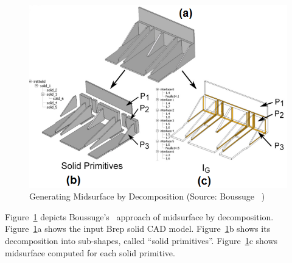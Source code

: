 
	\begin{figure} [!h]
		\centering
		\includegraphics[width=0.75\linewidth]{images/boussugedecomp}
		\caption{Generating Midsurface by Decomposition (Source: Boussuge~\cite{Boussuge2013a} )}
		\label{fig:litsurvey:boussugedecomp}
	\end{figure}


Figure~\ref{fig:litsurvey:boussugedecomp} depicts Boussuge's~\cite{Boussuge2013a} approach of midsurface by decomposition.
Figure~\ref{fig:litsurvey:boussugedecomp}a shows the input Brep solid CAD model. Figure~\ref{fig:litsurvey:boussugedecomp}b shows its decomposition into sub-shapes, called ``solid primitives''. Figure~\ref{fig:litsurvey:boussugedecomp}c shows midsurface computed for each solid primitive.


